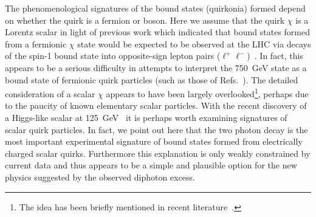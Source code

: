 The phenomenological signatures of the bound states (quirkonia) formed depend on
whether the quirk is a fermion or boson. Here we assume that the quirk $\chi$ is
a Lorentz scalar in light of previous work which indicated that bound states
formed from a fermionic $\chi$ state would be expected to be observed at the LHC
via decays of the spin-1 bound state into opposite-sign lepton pairs
($\ell^+\ell^-$)~\cite{Carlson:1991zn, Clarke:2011aa}. In fact, this appears to
be a serious difficulty in attempts to interpret the \SI{750}{\GeV} state as a
bound state of fermionic quirk particles (such as those of
Refs.~\cite{Kats:2016kuz, Curtin:2015jcv, Kamenik:2016izk}). The detailed
consideration of a scalar $\chi$ appears to have been largely
overlooked\footnote{The idea has been briefly mentioned in recent
  literature~\cite{Agrawal:2015dbf, Ko:2016sht}.}, perhaps due to the paucity of
known elementary scalar particles. With the recent discovery of a Higgs-like
scalar at \SI{125}{\GeV}~\cite{Aad:2012tfa, Chatrchyan:2012ufa} it is perhaps
worth examining signatures of scalar quirk particles. In fact, we point out here
that the two photon decay is the most important experimental signature of bound
states formed from electrically charged scalar quirks. Furthermore this
explanation is only weakly constrained by current data and thus appears to be a
simple and plausible option for the new physics suggested by the observed
diphoton excess.
